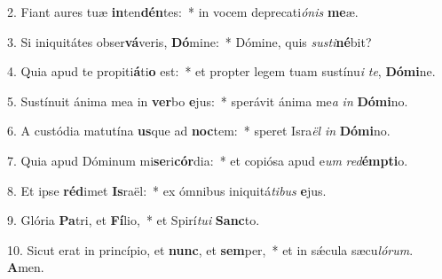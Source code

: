 2. Fiant aures tuæ \textbf{in}ten\textbf{dén}tes:~*  in vocem deprecati\textit{ó}\textit{nis} \textbf{me}æ.\

3. Si iniquitátes obser\textbf{vá}veris, \textbf{Dó}mine:~*  Dómine, quis \textit{sus}\textit{ti}\textbf{né}bit?\

4. Quia apud te propiti\textbf{á}ti\textbf{o} est:~*  et propter legem tuam sustínu\textit{i} \textit{te}, \textbf{Dó}\textbf{mi}ne.\

5. Sustínuit ánima mea in \textbf{ver}bo \textbf{e}jus:~*  sperávit ánima me\textit{a} \textit{in} \textbf{Dó}\textbf{mi}no.\

6. A custódia matutína \textbf{us}que ad \textbf{noc}tem:~*  speret Isra\textit{ël} \textit{in} \textbf{Dó}\textbf{mi}no.\

7. Quia apud Dóminum mi\textbf{se}ri\textbf{cór}dia:~*  et copiósa apud e\textit{um} \textit{red}\textbf{émp}\textbf{ti}o.\

8. Et ipse \textbf{réd}imet \textbf{Is}raël:~*  ex ómnibus iniquitá\textit{ti}\textit{bus} \textbf{e}jus.\

9. Glória \textbf{Pa}tri, et \textbf{Fí}lio,~*  et Spirí\textit{tu}\textit{i} \textbf{Sanc}to.\

10. Sicut erat in princípio, et \textbf{nunc}, et \textbf{sem}per,~*  et in sǽcula sæcu\textit{ló}\textit{rum}. \textbf{A}men.\

